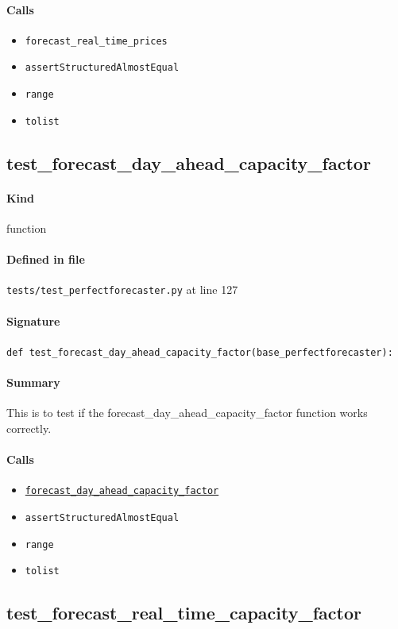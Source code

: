 \documentclass[11pt]{report}
\begin{document}
\paragraph{Calls}
\begin{itemize}[leftmargin=*]
  \item \texttt{forecast\_real\_time\_prices}
  \item \texttt{assertStructuredAlmostEqual}
  \item \texttt{range}
  \item \texttt{tolist}
\end{itemize}
\subsection{test\_forecast\_day\_ahead\_capacity\_factor}
\label{def:tests-test_perfectforecaster.py:test_forecast_day_ahead_capacity_factor:L127}
\paragraph{Kind} function
\paragraph{Defined in file} \texttt{tests/test\_perfectforecaster.py} at line 127
\paragraph{Signature} \texttt{def test\_forecast\_day\_ahead\_capacity\_factor(base\_perfectforecaster):}
\paragraph{Summary} This is to test if the forecast\_day\_ahead\_capacity\_factor function works correctly.
\paragraph{Calls}
\begin{itemize}[leftmargin=*]
  \item \hyperref[def:forecaster.py:PerfectForecaster.forecast_day_ahead_capacity_factor:L790]{\texttt{forecast\_day\_ahead\_capacity\_factor}}
  \item \texttt{assertStructuredAlmostEqual}
  \item \texttt{range}
  \item \texttt{tolist}
\end{itemize}
\subsection{test\_forecast\_real\_time\_capacity\_factor}
\label{def:tests-test_perfectforecaster.py:test_forecast_real_time_capacity_factor:L145}
\end{document}
